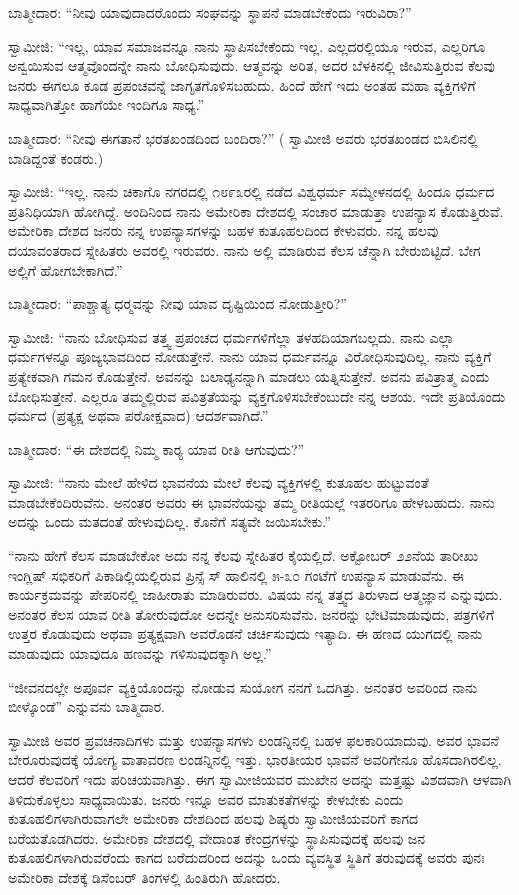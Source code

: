  ಬಾತ್ಮೀದಾರ: “ನೀವು ಯಾವುದಾದರೊಂದು ಸಂಘವನ್ನು ಸ್ಥಾಪನೆ ಮಾಡಬೇಕೆಂದು ಇರುವಿರಾ?” 

 ಸ್ವಾಮೀಜಿ: “ಇಲ್ಲ, ಯಾವ ಸಮಾಜವನ್ನೂ ನಾನು ಸ್ಥಾಪಿಸಬೇಕೆಂದು ಇಲ್ಲ. ಎಲ್ಲದರಲ್ಲಿಯೂ ಇರುವ, ಎಲ್ಲರಿಗೂ ಅನ್ವಯಿಸುವ ಆತ್ಮವೊಂದನ್ನೇ ನಾನು ಬೋಧಿಸುವುದು. ಆತ್ಮವನ್ನು ಅರಿತ, ಅದರ ಬೆಳಕಿನಲ್ಲಿ ಜೀವಿಸುತ್ತಿರುವ ಕೆಲವು ಜನರು ಈಗಲೂ ಕೂಡ ಪ್ರಪಂಚವನ್ನೆ ಜಾಗೃತಗೊಳಿಸಬಹುದು. ಹಿಂದೆ ಹೇಗೆ ಇದು ಅಂತಹ ಮಹಾ ವ್ಯಕ್ತಿಗಳಿಗೆ ಸಾಧ್ಯವಾಗಿತ್ತೋ ಹಾಗೆಯೇ ಇಂದಿಗೂ ಸಾಧ್ಯ.” 

 ಬಾತ್ಮೀದಾರ: “ನೀವು ಈಗತಾನೆ ಭರತಖಂಡದಿಂದ ಬಂದಿರಾ?” ( ಸ್ವಾಮೀಜಿ ಅವರು ಭರತಖಂಡದ ಬಿಸಿಲಿನಲ್ಲಿ ಬಾಡಿದ್ದಂತೆ ಕಂಡರು.) 

 ಸ್ವಾಮೀಜಿ: “ಇಲ್ಲ. ನಾನು ಚಿಕಾಗೊ ನಗರದಲ್ಲಿ ೧೮೯೩ರಲ್ಲಿ ನಡೆದ ವಿಶ್ವಧರ್ಮ ಸಮ್ಮೇಳನದಲ್ಲಿ ಹಿಂದೂ ಧರ್ಮದ ಪ್ರತಿನಿಧಿಯಾಗಿ ಹೋಗಿದ್ದೆ. ಅಂದಿನಿಂದ ನಾನು ಅಮೇರಿಕಾ ದೇಶದಲ್ಲಿ ಸಂಚಾರ ಮಾಡುತ್ತಾ ಉಪನ್ಯಾಸ ಕೊಡುತ್ತಿರುವೆ. ಅಮೇರಿಕಾ ದೇಶದ ಜನರು ನನ್ನ ಉಪನ್ಯಾಸಗಳನ್ನು ಬಹಳ ಕುತೂಹಲದಿಂದ ಕೇಳುವರು. ನನ್ನ ಹಲವು ದಯಾವಂತರಾದ ಸ್ನೇಹಿತರು ಅವರಲ್ಲಿ ಇರುವರು. ನಾನು ಅಲ್ಲಿ ಮಾಡಿರುವ ಕೆಲಸ ಚೆನ್ನಾಗಿ ಬೇರುಬಿಟ್ಟಿದೆ. ಬೇಗ ಅಲ್ಲಿಗೆ ಹೋಗಬೇಕಾಗಿದೆ.” 

 ಬಾತ್ಮೀದಾರ: “ಪಾಶ್ಚಾತ್ಯ ಧರ‍್ಮವನ್ನು ನೀವು ಯಾವ ದೃಷ್ಟಿಯಿಂದ ನೋಡುತ್ತೀರಿ?” 

 ಸ್ವಾಮೀಜಿ: “ನಾನು ಬೋಧಿಸುವ ತತ್ತ್ವ ಪ್ರಪಂಚದ ಧರ್ಮಗಳಿಗೆಲ್ಲಾ ತಳಹದಿಯಾಗಬಲ್ಲದು. ನಾನು ಎಲ್ಲಾ ಧರ್ಮಗಳನ್ನೂ ಪೂಜ್ಯಭಾವದಿಂದ ನೋಡುತ್ತೇನೆ. ನಾನು ಯಾವ ಧರ್ಮವನ್ನೂ ವಿರೋಧಿಸುವುದಿಲ್ಲ. ನಾನು ವ್ಯಕ್ತಿಗೆ ಪ್ರತ್ಯೇಕವಾಗಿ ಗಮನ ಕೊಡುತ್ತೇನೆ. ಅವನನ್ನು ಬಲಾಢ್ಯನನ್ನಾಗಿ ಮಾಡಲು ಯತ್ನಿಸುತ್ತೇನೆ. ಅವನು ಪವಿತ್ರಾತ್ಮ ಎಂದು ಬೋಧಿಸುತ್ತೇನೆ. ಎಲ್ಲರೂ ತಮ್ಮಲ್ಲಿರುವ ಪವಿತ್ರತೆಯನ್ನು ವ್ಯಕ್ತಗೊಳಿಸಬೇಕೆಂಬುದೇ ನನ್ನ ಆಶಯ. ಇದೇ ಪ್ರತಿಯೊಂದು ಧರ್ಮದ (ಪ್ರತ್ಯಕ್ಷ ಅಥವಾ ಪರೋಕ್ಷವಾದ) ಆದರ್ಶವಾಗಿದೆ.” 

 ಬಾತ್ಮೀದಾರ: “ಈ ದೇಶದಲ್ಲಿ ನಿಮ್ಮ ಕಾರ‍್ಯ ಯಾವ ರೀತಿ ಆಗುವುದು?” 

 ಸ್ವಾಮೀಜಿ: “ನಾನು ಮೇಲೆ ಹೇಳಿದ ಭಾವನೆಯ ಮೇಲೆ ಕೆಲವು ವ್ಯಕ್ತಿಗಳಲ್ಲಿ ಕುತೂಹಲ ಹುಟ್ಟುವಂತೆ ಮಾಡಬೇಕೆಂದಿರುವೆನು. ಅನಂತರ ಅವರು ಈ ಭಾವನೆಯನ್ನು ತಮ್ಮ ರೀತಿಯಲ್ಲೆ ಇತರರಿಗೂ ಹೇಳಬಹುದು. ನಾನು ಅದನ್ನು ಒಂದು ಮತದಂತೆ ಹೇಳುವುದಿಲ್ಲ. ಕೊನೆಗೆ ಸತ್ಯವೇ ಜಯಿಸಬೇಕು.” 

 “ನಾನು ಹೇಗೆ ಕೆಲಸ ಮಾಡಬೇಕೋ ಅದು ನನ್ನ ಕೆಲವು ಸ್ನೇಹಿತರ ಕೈಯಲ್ಲಿದೆ. ಅಕ್ಟೋಬರ್ ೨೨ನೆಯ ತಾರೀಖು ಇಂಗ್ಲಿಷ್ ಸಭಿಕರಿಗೆ ಪಿಕಾಡಿಲ್ಲಿಯಲ್ಲಿರುವ ಪ್ರಿನ್ಸೆ ಸ್ ಹಾಲಿನಲ್ಲಿ ೫-೩೦ ಗಂಟೆಗೆ ಉಪನ್ಯಾಸ ಮಾಡುವೆನು. ಈ ಕಾರ್ಯಕ್ರಮವನ್ನು ಪೇಪರಿನಲ್ಲಿ ಜಾಹೀರಾತು ಮಾಡಿರುವರು. ವಿಷಯ ನನ್ನ ತತ್ತ್ವದ ತಿರುಳಾದ ಆತ್ಮಜ್ಞಾನ ಎನ್ನುವುದು. ಅನಂತರ ಕೆಲಸ ಯಾವ ರೀತಿ ತೋರುವುದೋ ಅದನ್ನೇ ಅನುಸರಿಸುವೆನು. ಜನರನ್ನು ಭೇಟಿಮಾಡುವುದು, ಪತ್ರಗಳಿಗೆ ಉತ್ತರ ಕೊಡುವುದು ಅಥವಾ ಪ್ರತ್ಯಕ್ಷವಾಗಿ ಅವರೊಡನೆ ಚರ್ಚಿಸುವುದು ಇತ್ಯಾದಿ. ಈ ಹಣದ ಯುಗದಲ್ಲಿ ನಾನು ಮಾಡುವುದು ಯಾವುದೂ ಹಣವನ್ನು ಗಳಿಸುವುದಕ್ಕಾಗಿ ಅಲ್ಲ.” 

 “ಜೀವನದಲ್ಲೇ ಅಪೂರ್ವ ವ್ಯಕ್ತಿಯೊಂದನ್ನು ನೋಡುವ ಸುಯೋಗ ನನಗೆ ಒದಗಿತ್ತು. ಅನಂತರ ಅವರಿಂದ ನಾನು ಬೀಳ್ಕೊಂಡೆ” ಎನ್ನುವನು ಬಾತ್ಮಿದಾರ. 

 ಸ್ವಾಮೀಜಿ ಅವರ ಪ್ರವಚನಾದಿಗಳು ಮತ್ತು ಉಪನ್ಯಾಸಗಳು ಲಂಡನ್ನಿನಲ್ಲಿ ಬಹಳ ಫಲಕಾರಿಯಾದುವು. ಅವರ ಭಾವನೆ ಬೇರೂರುವುದಕ್ಕೆ ಯೋಗ್ಯ ವಾತಾವರಣ ಲಂಡನ್ನಿನಲ್ಲಿ ಇತ್ತು. ಭಾರತೀಯರ ಭಾವನೆ ಅವರಿಗೇನೂ ಹೊಸದಾಗಿರಲಿಲ್ಲ. ಆದರೆ ಕೆಲವರಿಗೆ ಇದು ಪರಿಚಯವಾಗಿತ್ತು. ಈಗ ಸ್ವಾಮೀಜಿಯವರ ಮುಖೇನ ಅದನ್ನು ಮತ್ತಷ್ಟು ವಿಶದವಾಗಿ ಆಳವಾಗಿ ತಿಳಿದುಕೊಳ್ಳಲು ಸಾಧ್ಯವಾಯಿತು. ಜನರು ಇನ್ನೂ ಅವರ ಮಾತುಕತೆಗಳನ್ನು ಕೇಳಬೇಕು ಎಂದು ಕುತೂಹಲಿಗಳಾಗಿರುವಾಗಲೇ ಅಮೇರಿಕಾ ದೇಶದಿಂದ ಹಲವು ಶಿಷ್ಯರು ಸ್ವಾಮೀಜಿಯವರಿಗೆ ಕಾಗದ ಬರೆಯತೊಡಗಿದರು. ಅಮೇರಿಕಾ ದೇಶದಲ್ಲಿ ವೇದಾಂತ ಕೇಂದ್ರಗಳನ್ನು ಸ್ಥಾಪಿಸುವುದಕ್ಕೆ ಹಲವು ಜನ ಕುತೂಹಲಿಗಳಾಗಿರುವರೆಂದು ಕಾಗದ ಬರೆದುದರಿಂದ ಅದನ್ನು ಒಂದು ವ್ಯವಸ್ಥಿತ ಸ್ಥಿತಿಗೆ ತರುವುದಕ್ಕೆ ಅವರು ಪುನಃ ಅಮೇರಿಕಾ ದೇಶಕ್ಕೆ ಡಿಸೆಂಬರ್ ತಿಂಗಳಲ್ಲಿ ಹಿಂತಿರುಗಿ ಹೋದರು. 

